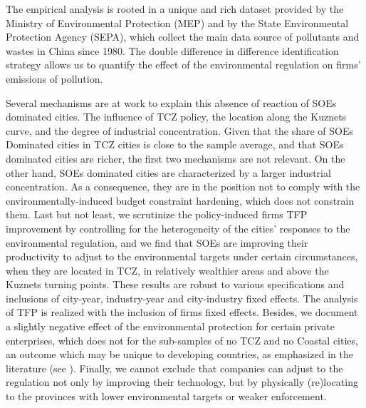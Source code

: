 \documentclass[12pt]{article}
\begin{document}
The empirical analysis is rooted in a unique and rich dataset provided by the Ministry of Environmental Protection (MEP) and by the State Environmental Protection Agency (SEPA), which collect the main data source of pollutants and wastes in China since 1980. The double difference in difference identification strategy allows us to quantify the effect of the environmental regulation on firms' emissions of pollution. 


Several mechanisms are at work to explain this absence of reaction of SOEs dominated cities. The influence of TCZ policy, the location along the Kuznets curve, and the degree of industrial concentration.  Given that the share of SOEs Dominated cities in TCZ cities is close to the sample average, and that SOEs dominated cities are richer, the first two mechanisms are not relevant.  On the other hand, SOEs dominated cities are characterized by a larger industrial concentration. As a consequence, they are in the position not to comply with the environmentally-induced budget constraint hardening, which does not constrain them. Last but not least, we scrutinize the policy-induced firms TFP improvement by controlling for the heterogeneity of the cities' responses to the environmental regulation, and we find that SOEs are improving their productivity to adjust to the environmental targets under certain circumstances, when they are located in TCZ, in relatively wealthier areas and above the Kuznets turning points. These results are robust to various specifications and inclusions of city-year, industry-year and city-industry fixed effects. The analysis of TFP is realized with the inclusion of firms fixed effects. Besides, we document a slightly negative effect of the environmental protection for certain private enterprises, which does not for the sub-samples of no TCZ and no Coastal cities, an outcome which may be unique to developing countries, as emphasized in the literature (see \cite{Jefferson2013-az}). Finally, we cannot exclude that companies can adjust to the regulation not only by improving their technology, but by physically (re)locating to the provinces with lower environmental targets or weaker enforcement.
\end{document}
